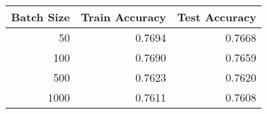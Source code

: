 \begin{tabular}{|r||r|r|}
\hline
Batch Size & Train Accuracy & Test Accuracy \\
\hline
50 & 0.7694 & 0.7668 \\
100 & 0.7690 & 0.7659 \\
500 & 0.7623 & 0.7620 \\
1000 & 0.7611 & 0.7608 \\
\hline
\end{tabular}
